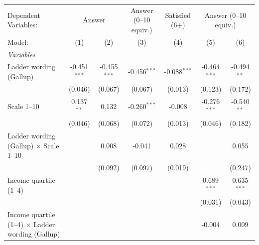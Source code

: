 
\begingroup
\centering
\begin{tabular}{lcccccc}
   \tabularnewline \midrule \midrule
   Dependent Variables: & \multicolumn{2}{c}{Answer} & Answer (0--10 equiv.) & Satisfied (6+) & \multicolumn{2}{c}{Answer (0--10 equiv.)}\\
   Model:                                                                         & (1)            & (2)            & (3)            & (4)            & (5)            & (6)\\  
   \midrule
   \emph{Variables}\\
   Ladder wording (Gallup)                                                        & -0.451$^{***}$ & -0.455$^{***}$ & -0.456$^{***}$ & -0.088$^{***}$ & -0.464$^{***}$ & -0.494$^{**}$\\   
                                                                                  & (0.046)        & (0.067)        & (0.067)        & (0.013)        & (0.123)        & (0.172)\\   
   Scale 1--10                                                                    & 0.137$^{**}$   & 0.132          & -0.260$^{***}$ & -0.008         & -0.276$^{***}$ & -0.540$^{**}$\\   
                                                                                  & (0.046)        & (0.068)        & (0.072)        & (0.013)        & (0.046)        & (0.182)\\   
   Ladder wording (Gallup) $\times$ Scale 1--10                                   &                & 0.008          & -0.041         & 0.028          &                & 0.055\\   
                                                                                  &                & (0.092)        & (0.097)        & (0.019)        &                & (0.247)\\   
   Income quartile (1--4)                                                         &                &                &                &                & 0.689$^{***}$  & 0.635$^{***}$\\   
                                                                                  &                &                &                &                & (0.031)        & (0.043)\\   
   Income quartile (1--4) $\times$ Ladder wording (Gallup)                        &                &                &                &                & -0.004         & 0.009\\   

\end{tabular}

